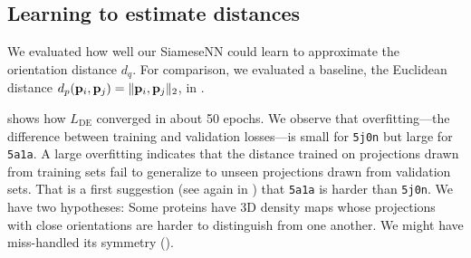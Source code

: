 \subsection{Learning to estimate distances}\label{sec:results:distance-estimation:learned}



We evaluated how well our SiameseNN could learn  to approximate the orientation distance $d_q$.
For comparison, we evaluated a baseline, the Euclidean distance $d_p(\mathbf{p}_i,\mathbf{p}_j) = \|\mathbf{p}_i, \mathbf{p}_j\|_2$, in .

 shows how $L_\text{DE}$ converged in about 50 epochs.
We observe that overfitting---the difference between training and validation losses---is small for \texttt{5j0n} but large for \texttt{5a1a}.
A large overfitting indicates that the distance trained on projections drawn from training sets fail to generalize to unseen projections drawn from validation sets.
That is a first suggestion (see again in ) that \texttt{5a1a} is harder than \texttt{5j0n}.
We have two hypotheses: Some proteins have 3D density maps whose projections with close orientations are harder to distinguish from one another.
We might have miss-handled its symmetry ().

